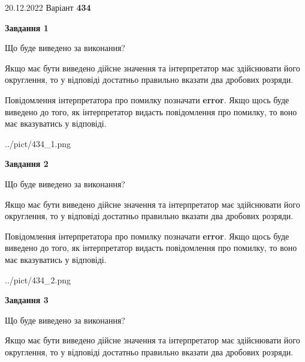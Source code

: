 \documentclass[12pt, ukrainian]{article}
\begin{document}
{20.12.2022 Варіант \No \textbf { 434 }\par}
{
\begin {Large}

{\begin {center}\textbf{Завдання 1}\end {center}}\par
Що буде виведено за виконання? \par

Якщо має бути виведено дійсне значення та інтерпретатор має здійснювати його округлення, 
то у відповіді достатньо правильно вказати два дробових розряди.

Повідомлення інтерпретатора про помилку позначати \textbf{error}.
Якщо щось буде виведено до того, як інтерпретатор видасть повідомлення про помилку, 
то воно має вказуватись у відповіді. \par

\begin{center}
	{../pict/434_1.png}
\end{center}
\newpage

{\begin {center}\textbf{Завдання 2}\end {center}}\par
Що буде виведено за виконання? \par

Якщо має бути виведено дійсне значення та інтерпретатор має здійснювати його округлення, 
то у відповіді достатньо правильно вказати два дробових розряди.

Повідомлення інтерпретатора про помилку позначати \textbf{error}.
Якщо щось буде виведено до того, як інтерпретатор видасть повідомлення про помилку, 
то воно має вказуватись у відповіді. \par

\begin{center}
	{../pict/434_2.png}
\end{center}
\newpage

{\begin {center}\textbf{Завдання 3}\end {center}}\par
Що буде виведено за виконання? \par

Якщо має бути виведено дійсне значення та інтерпретатор має здійснювати його округлення, 
то у відповіді достатньо правильно вказати два дробових розряди.


\end{Large}}
\end{document}
